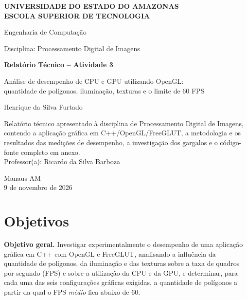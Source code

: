 \documentclass[12pt,a4paper]{article}
\newcommand{\instituicao}{Universidade do Estado do Amazonas\\[0.2em] Escola Superior de Tecnologia}
\newcommand{\curso}{Engenharia de Computação}
\newcommand{\disciplina}{Processamento Digital de Imagens}
\newcommand{\professor}{Ricardo da Silva Barboza}
\newcommand{\autor}{Henrique da Silva Furtado}
\newcommand{\local}{Manaus-AM}
\newcommand{\data}{9 de novembro de 2026}
\begin{document}
\begin{titlepage}
\centering
{\large\bfseries \MakeUppercase{\instituicao}\par}
{\large \curso\par}
{\large Disciplina: \disciplina\par}
\vfill
{\LARGE\bfseries Relatório Técnico -- Atividade 3\par}
\vspace{0.8cm}
{\Large Análise de desempenho de CPU e GPU utilizando OpenGL:\\[0.2em]
quantidade de polígonos, iluminação, texturas e o limite de 60 FPS\par}
\vfill
{\large \autor\par}
\vspace{1.5cm}
\begin{flushright}
\begin{minipage}{0.55\textwidth}
Relatório técnico apresentado à disciplina de \disciplina, contendo a aplicação gráfica em
C++/OpenGL/FreeGLUT, a metodologia e os resultados das medições de desempenho, a investigação
dos gargalos e o código-fonte completo em anexo.\\[0.6em]
Professor(a): \professor
\end{minipage}
\end{flushright}
\vfill
{\large \local\\ \data\par}
\end{titlepage}

\tableofcontents
\newpage
\listoffigures
\listoftables
\newpage
{}

\section{Objetivos}

\textbf{Objetivo geral.} Investigar experimentalmente o desempenho de uma aplicação gráfica
em C++ com OpenGL e FreeGLUT, analisando a influência da quantidade de polígonos, da
iluminação e das texturas sobre a taxa de quadros por segundo (FPS) e sobre a utilização da
CPU e da GPU, e determinar, para cada uma das seis configurações gráficas exigidas, a
quantidade de polígonos a partir da qual o FPS \emph{médio} fica abaixo de 60.
\end{document}
